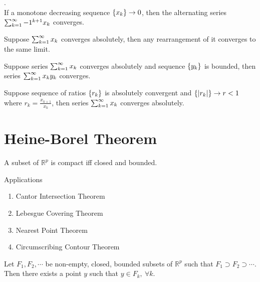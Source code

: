 	\begin{theorem}.\\
		If a monotone decreasing sequence $\sequence{x_k} \to 0$, then the alternating series $\series{-1^{k+1}x_k}{k}$ converges.
	\end{theorem}

	\begin{theorem}[rearrangement]
		Suppose $\series{x_k}{k}$ converges absolutely, then any rearrangement of it converges to the same limit.
	\end{theorem}

	\begin{remark}
		Suppose series $\series{x_k}{k}$ converges absolutely and sequence $\sequence{y_k}$ is bounded, then series $\series{x_ky_k}{k}$ converges.
	\end{remark}
	
	\begin{theorem}
		Suppose sequence of ratios $\sequence{r_k}$ is absolutely convergent and $\sequence{|r_k|} \to r < 1$ where $r_k = \frac{x_{k+1}}{x_k}$, then series $\series{x_k}{k}$ converges absolutely.
	\end{theorem}

\section{Heine-Borel Theorem}
	\begin{theorem}
		A subset of $\mathbb{R}^p$ is compact iff closed and bounded.
	\end{theorem}

	\begin{remark}
		Applications
		\begin{enumerate}
			\item Cantor Intersection Theorem
			\item Lebesgue Covering Theorem
			\item Nearest Point Theorem
			\item Circumscribing Contour Theorem
		\end{enumerate}
	\end{remark}

	\begin{theorem}
		Let $F_1, F_2, \cdots$ be non-empty, closed, bounded subsets of $\mathbb{R}^p$ such that $F_1 \supset F_2 \supset \cdots$. Then there exists a point $y$ such that $y \in F_k,\ \forall k$.
	\end{theorem}

